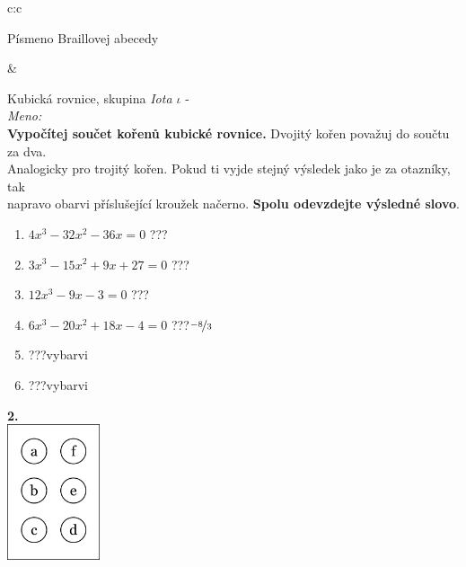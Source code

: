 \documentclass[10pt]{report}
\begin{document}
\begin{tabular}{c:c}
\begin{minipage}[c][99mm][t]{0.49\linewidth}
\begin{center}
\begin{minipage}{0.20\linewidth}
\begin{center}
{\small Písmeno Braillovej abecedy}
\end{center}
\end{minipage}
\end{center}
\end{minipage}
&
\begin{minipage}[c][99mm][t]{0.49\linewidth}
\begin{center}
\vspace{7mm}
{\huge Kubická rovnice, skupina \textit{Iota $\iota$} -}\\[4.5mm]
\textit{Meno:}\phantom{xxxxxxxxxxxxxxxxxxxxxxxxxxxxxxxxxxxxxxxxxxxxxxxxxxxxxxxxxxxxxxxxx}\\[3.5mm]
\textbf{Vypočítej součet kořenů kubické rovnice.} Dvojitý kořen považuj do součtu za dva.\\Analogicky pro trojitý kořen. Pokud ti vyjde stejný výsledek jako je za otazníky, tak\\napravo obarvi příslušející kroužek načerno. \textbf{Spolu odevzdejte výsledné slovo}.\\[3mm]
\begin{minipage}{0.77\linewidth}
\begin{center}
\begin{varwidth}{\textwidth}
\begin{enumerate}
\large
\item $4x^3-32x^2-36x=0$\quad \dotfill\; ???\;\dotfill {}
\item $3x^3-15x^2+9x+27=0$\quad \dotfill\; ???\;\dotfill {}
\item $12x^3-9x-3=0$\quad \dotfill\; ???\;\dotfill {}
\item $6x^3-20x^2+18x-4=0$\quad \dotfill\; ???\;\dotfill \quad $\nicefrac{-8}{3}$
\item \quad \dotfill\; ???\;\dotfill \quad vybarvi
\item \quad \dotfill\; ???\;\dotfill \quad vybarvi
\end{enumerate}
\end{varwidth}
\end{center}
\end{minipage}
\begin{minipage}{0.20\linewidth}
\begin{center}
{\Huge\bfseries 2.} \\[2mm]
\includegraphics[height=40mm]{../images/braille.png}

\end{center}
\end{minipage}
\end{center}
\end{minipage}
\end{tabular}
\end{document}
